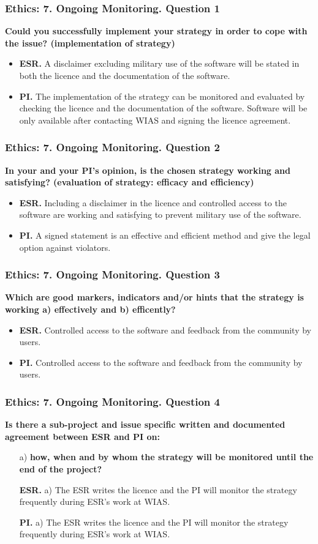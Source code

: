 \documentclass[t,xcolor=table,english]{beamer}   %
\begin{document}
\begin{frame}
	\frametitle{Ethics: 7. Ongoing Monitoring. Question 1}
	{\color{blue}\bf Could you successfully implement your strategy in order to cope with the issue? (implementation of strategy)}
	\begin{itemize}
		\item \textbf{ESR.} A disclaimer excluding military use of the software will be stated in both the licence and the documentation of the software.
		\item \textbf{PI.} The implementation of the strategy can be monitored and evaluated by checking the licence and the documentation of the software. Software will be only available after contacting WIAS and signing the licence agreement.
	\end{itemize}
\end{frame}

\begin{frame}
	\frametitle{Ethics: 7. Ongoing Monitoring. Question 2}
	{\color{blue}\bf In your and your PI's opinion, is the chosen strategy working and satisfying? (evaluation of strategy: efficacy and efficiency)}
	\begin{itemize}
		\item \textbf{ESR.} Including a disclaimer in the licence and controlled access to the software are working and satisfying to prevent military use of the software.
		\item \textbf{PI.} A signed statement is an effective and efficient method and give the legal option against violators.
	\end{itemize}
\end{frame}

\begin{frame}
	\frametitle{Ethics: 7. Ongoing Monitoring. Question 3}
	{\color{blue}\bf Which are good markers, indicators and/or hints that the strategy is working a) effectively and b) efficently?}
	\begin{itemize}
		\item \textbf{ESR.} Controlled access to the software and feedback from the community by users.
		\item \textbf{PI.} Controlled access to the software and feedback from the community by users.
	\end{itemize}
\end{frame}

\begin{frame}
	\frametitle{Ethics: 7. Ongoing Monitoring. Question 4}
	{\color{blue}\bf Is there a sub-project and issue specific written and documented agreement between ESR and PI on:}
	\begin{itemize}
		\item[a)] {\color{blue}\bf how, when and by whom the strategy will be monitored until the end of the project?}
		
		\textbf{ESR.} a) The ESR writes the licence and the PI will monitor the strategy frequently during ESR's work at WIAS.
		
		\textbf{PI.} a) The ESR writes the licence and the PI will monitor the strategy frequently during ESR's work at WIAS.
	\end{itemize}
\end{frame}
\end{document}
